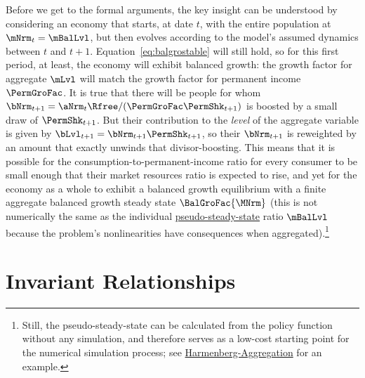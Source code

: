 \documentclass[BufferStockTheory]{subfiles}
\begin{document}
Before we get to the formal arguments, the key insight can be understood by considering an economy that starts, at date $t$, with the entire population at $\mNrm_{t}=\mBalLvl$, but then evolves according to the model's assumed dynamics between $t$ and $t+1$.  Equation~\eqref{eq:balgrostable} will still hold, so for this first period, at least, the economy will exhibit balanced growth: the growth factor for aggregate $\mLvl$ will match the growth factor for permanent income $\PermGroFac$.  It is true that there will be people for whom $\bNrm_{t+1}=\aNrm_{t}\Rfree/(\PermGroFac\PermShk_{t+1})$ is boosted by a small draw of $\PermShk_{t+1}$.  But their contribution to the \textit{level} of the aggregate variable is given by $\bLvl_{t+1}=\bNrm_{t+1}\PermShk_{t+1}$, so their $\bNrm_{t+1}$ is reweighted by an amount that exactly unwinds that divisor-boosting.  This means that it is possible for the consumption-to-permanent-income ratio for every consumer to be small enough that their market resources ratio is expected to rise, and yet for the economy as a whole to exhibit a balanced growth equilibrium with a finite aggregate balanced growth steady state $\BalGroFac{\MNrm}$ (this is not numerically the same as the individual \hyperlink{pseudo-steady-state}{pseudo-steady-state} ratio $\mBalLvl$ because the problem's nonlinearities have consequences when aggregated).\footnote{Still, the pseudo-steady-state can be calculated from the policy function without any simulation, and therefore serves as a low-cost starting point for the numerical simulation process; see \href{https://econ-ark.org/materials/harmenberg-aggregation?launch}{Harmenberg-Aggregation} for an example.}



\hypertarget{The-Aggregate-and-Idiosyncratic-Relationship-Between-Consumption-Growth-and-Income-Growth}{}
\section{Invariant Relationships}

\end{document}

